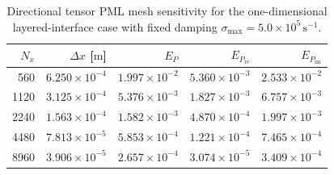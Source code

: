 \begin{table}[H]
    \centering
    \caption{Directional tensor PML mesh sensitivity for the one-dimensional layered-interface case with fixed damping $\sigma_{\max}=5.0\times10^5\,\mathrm{s^{-1}}$.}
    \label{tab:pmlMeshSensitivity}
    \begin{tabular}{rrrrr}
        \toprule
        $N_x$ & $\Delta x$ [$\mathrm{m}$] & $E_P$ & $E_{P_{\mathrm{re}}}$ & $E_{P_{\mathrm{im}}}$ \\
        \midrule
        560 & $6.250\times10^{-4}$ & $1.997\times10^{-2}$ & $5.360\times10^{-3}$ & $2.533\times10^{-2}$ \\
        1120 & $3.125\times10^{-4}$ & $5.376\times10^{-3}$ & $1.827\times10^{-3}$ & $6.757\times10^{-3}$ \\
        2240 & $1.563\times10^{-4}$ & $1.582\times10^{-3}$ & $4.870\times10^{-4}$ & $1.997\times10^{-3}$ \\
        4480 & $7.813\times10^{-5}$ & $5.853\times10^{-4}$ & $1.221\times10^{-4}$ & $7.465\times10^{-4}$ \\
        8960 & $3.906\times10^{-5}$ & $2.657\times10^{-4}$ & $3.074\times10^{-5}$ & $3.409\times10^{-4}$ \\
        \bottomrule
    \end{tabular}
\end{table}
